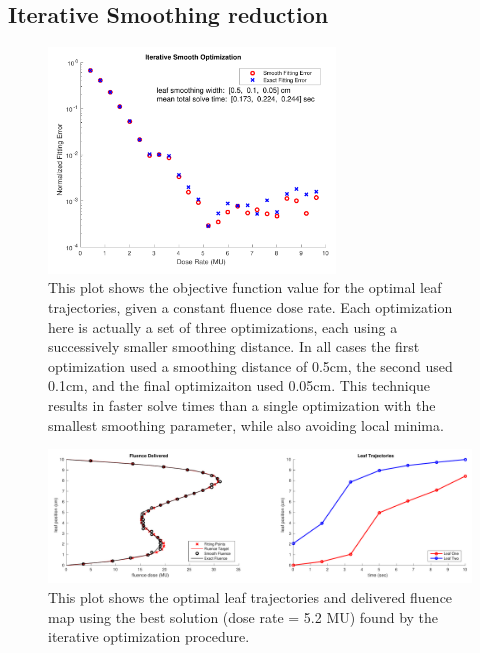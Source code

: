 \subsection{Iterative Smoothing reduction}


\begin{figure}
  \centering
  \includegraphics[width=3in]{fig/iterSmoothSweep.pdf}
  \caption{This plot shows the objective function value for the optimal leaf trajectories,
           given a constant fluence dose rate. Each optimization here is actually a set of three
           optimizations, each using a successively smaller smoothing distance. In all cases
           the first optimization used a smoothing distance of 0.5cm, the second used 0.1cm,
           and the final optimizaiton used 0.05cm. This technique results in faster solve times
           than a single optimization with the smallest smoothing parameter, while also avoiding
           local minima.}
  \label{fig:iterSmoothSweep}
\end{figure}




\begin{figure}
  \centering
  \includegraphics[width=\textwidth]{fig/fluenceMapIterativeBest.pdf}
  \caption{This plot shows the optimal leaf trajectories and delivered fluence map using the
           best solution (dose rate = 5.2 MU) found by the iterative optimization procedure.}
  \label{fig:fluenceMapIterativeBest}
\end{figure}



